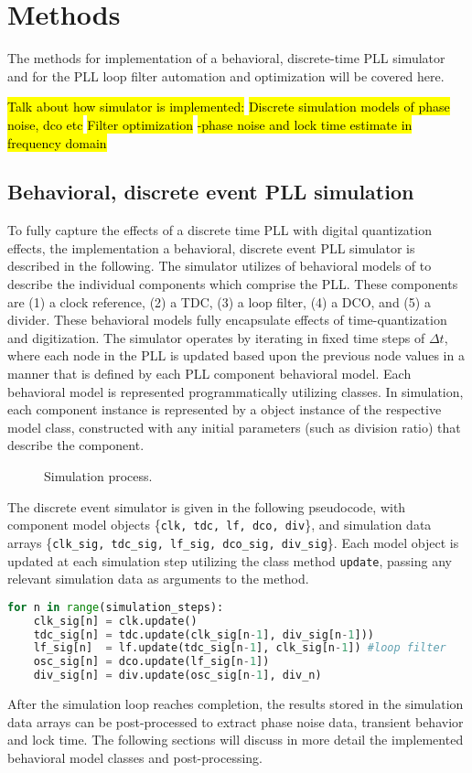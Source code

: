 \section{Methods}\label{methods}
The methods for implementation of a behavioral, discrete-time PLL simulator and for the PLL loop filter automation and optimization will be covered here.

\hl{Talk about how simulator is implemented:}
\hl{Discrete simulation models of phase noise, dco etc}
\hl{Filter optimization}
\hl{-phase noise and lock time estimate in frequency domain}

\subsection{Behavioral, discrete event PLL simulation}
To fully capture the effects of a discrete time PLL with digital quantization effects, the implementation a behavioral, discrete event PLL simulator is described in the following. The simulator utilizes of behavioral models of to describe the individual components which comprise the PLL. These components are (1) a clock reference, (2) a TDC, (3) a loop filter, (4) a DCO, and (5) a divider. These behavioral models fully encapsulate effects of time-quantization and digitization. The simulator operates by iterating in fixed time steps of $\Delta t$, where each node in the PLL is updated based upon the previous node values in a manner that is defined by each PLL component behavioral model. Each behavioral model is represented programmatically utilizing classes. In simulation, each component instance is represented by a object instance of the respective model class, constructed with any initial parameters (such as division ratio) that describe the component.
\begin{figure}[htb!]
	\center
	\caption{Simulation process.}
	\label{fig:simulator}
\end{figure}
\FloatBarrier
The discrete event simulator is given in the following pseudocode, with component model objects \{\texttt{clk, tdc, lf, dco, div}\}, and simulation data arrays \{\texttt{clk\_sig, tdc\_sig, lf\_sig, dco\_sig, div\_sig}\}. Each model object is updated at each simulation step utilizing the class method \texttt{update}, passing any relevant simulation data as arguments to the method.

\begin{lstlisting}[language={Python}, caption={PLL simulation loop Python pseudocode}, label={sim_code}]
for n in range(simulation_steps):
    clk_sig[n] = clk.update()
    tdc_sig[n] = tdc.update(clk_sig[n-1], div_sig[n-1]))
    lf_sig[n]  = lf.update(tdc_sig[n-1], clk_sig[n-1]) #loop filter
    osc_sig[n] = dco.update(lf_sig[n-1])
    div_sig[n] = div.update(osc_sig[n-1], div_n)
    \end{lstlisting}
After the simulation loop reaches completion, the results stored in the simulation data arrays can be post-processed to extract phase noise data, transient behavior and lock time. The following sections will discuss in more detail the implemented behavioral model classes and post-processing.

